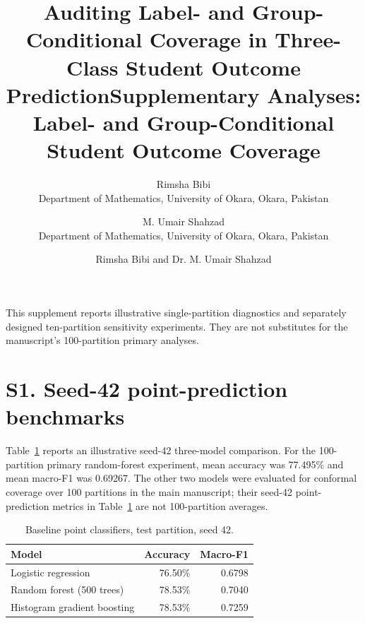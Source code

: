 \theoremstyle{plain}
\newtheorem{theorem}{Theorem}
\newtheorem{lemma}[theorem]{Lemma}
\theoremstyle{definition}
\newtheorem{definition}[theorem]{Definition}
\theoremstyle{remark}
\newtheorem{remark}[theorem]{Remark}

\newcommand{\Prob}{\mathbb{P}}
\newcommand{\Ind}{\mathbf{1}}
\newcommand{\Yset}{\mathcal{Y}}
\newcommand{\qhat}{\hat{q}}
\newcommand{\pihat}{\hat{\pi}}

\title{\bfseries Auditing Label- and Group-Conditional Coverage in Three-Class Student Outcome Prediction}

\author{%
Rimsha Bibi \\
\small Department of Mathematics, University of Okara, Okara, Pakistan
\and
M. Umair Shahzad \\
\small Department of Mathematics, University of Okara, Okara, Pakistan
}
\date{}
\title{Supplementary Analyses: Label- and Group-Conditional Student Outcome Coverage}
\author{Rimsha Bibi and Dr. M. Umair Shahzad}
\date{}

\maketitle
\noindent This supplement reports illustrative single-partition diagnostics and
separately designed ten-partition sensitivity experiments. They are not
substitutes for the manuscript's 100-partition primary analyses.

\section*{S1. Seed-42 point-prediction benchmarks}


Table~\ref{tab:baselines} reports an illustrative seed-42 three-model comparison.
For the 100-partition primary random-forest experiment, mean accuracy was
77.495\% and mean macro-F1 was 0.69267. The other two models were evaluated for conformal coverage over 100
partitions in the main manuscript; their seed-42 point-prediction metrics
in Table~\ref{tab:baselines} are not 100-partition averages.

\begin{table}[htbp]
\centering
\caption{Baseline point classifiers, test partition, seed 42.}
\label{tab:baselines}
\begin{tabular}{lrr}
\toprule
\textbf{Model} & \textbf{Accuracy} & \textbf{Macro-F1} \\
\midrule
Logistic regression            & 76.50\% & 0.6798 \\
Random forest (500 trees)      & 78.53\% & 0.7040 \\
Histogram gradient boosting    & 78.53\% & 0.7259 \\
\bottomrule
\end{tabular}
\end{table}

